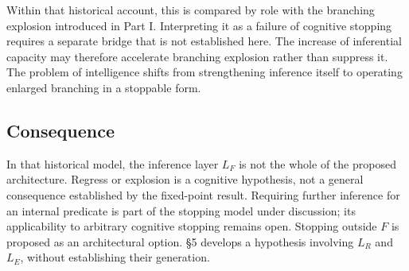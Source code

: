 Within that historical account, this is compared by role with the branching explosion introduced in Part I. Interpreting it as a failure of cognitive stopping requires a separate bridge that is not established here. The increase of inferential capacity may therefore accelerate branching explosion rather than suppress it. The problem of intelligence shifts from strengthening inference itself to operating enlarged branching in a stoppable form.

\subsection{Consequence}

In that historical model, the inference layer $L_F$ is not the whole of the proposed architecture. Regress or explosion is a cognitive hypothesis, not a general consequence established by the fixed-point result. Requiring further inference for an internal predicate is part of the stopping model under discussion; its applicability to arbitrary cognitive stopping remains open. Stopping outside $F$ is proposed as an architectural option. \S{}5 develops a hypothesis involving $L_R$ and $L_E$, without establishing their generation.

\bigskip
